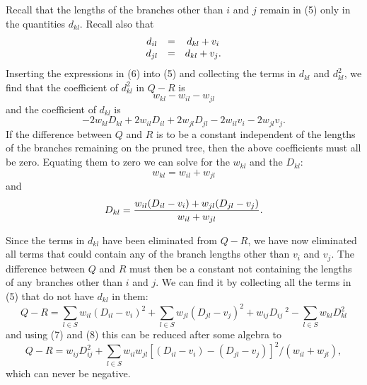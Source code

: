 \documentclass[12pt]{article}
\begin{document}
Recall that the lengths of the branches other than $i$ and $j$ remain in (5) only 
in the quantities $d_{kl}$.  Recall also that 
\begin{equation}
\begin{array}{c c c}
  d_{il}  & =  & d_{kl}  +  v_i\\
  d_{jl}  & =  & d_{kl}  +  v_j.
\end{array}
\end{equation}
\bigskip
Inserting the expressions in (6) into (5) and collecting the terms in
$d_{kl}$ and $d_{kl}^2$, we find that the coefficient of $d_{kl}^2$
in $Q - R$ is
\begin{displaymath}
  w_{kl}  -  w_{il}  -  w_{jl}              
\end{displaymath}
\noindent
and the coefficient of $d_{kl}$ is 
\begin{displaymath}
     - 2 w_{kl} D_{kl}  +  2 w_{il} D_{il}  +  2 w_{jl} D_{jl}  -  2 w_{il} v_i  -  2 w_{jl} v_j.
\end{displaymath}
\bigskip
If the difference between $Q$ and $R$ is to be a constant independent of the
lengths of the branches remaining on the pruned tree, then the above 
coefficients must all
be zero.  Equating them to zero we can solve for the $w_{kl}$ and the $D_{kl}$:
\begin{equation}
  w_{kl}   =   w_{il}  +  w_{jl}
\end{equation}
and
\begin{equation} %
           D_{kl}   = { w_{il} (D_{il} - v_i)  +  w_{jl} (D_{jl} - v_j) \over w_{il}     +     w_{jl}}.
\end{equation}

Since the terms in $d_{kl}$ have been eliminated from $Q - R$, we have now
eliminated all terms that could contain any of the 
branch lengths other than $v_i$ and
$v_j$.  The difference between $Q$ and $R$ must then be a constant not
containing the lengths of any branches other than $i$ and $j$.  We can 
find it by collecting all the terms in (5) that do not have $d_{kl}$
in them:
\begin{equation} %
         Q  -  R   =   \sum_{l\in S}  w_{il} (D_{il} - v_i)^2  +  \sum _{l\in S} w_{jl} (D_{jl} - v_j)^2  + w_{ij} D_{ij}\ ^2 - \sum_{l\in S} w_{kl} D_{kl}^2   
\end{equation}
\noindent
and using (7) and (8) this can be reduced after some algebra to
\begin{equation} %
   Q - R  =  w_{ij} D_{ij}^2 +  \sum_{l\in S}  w_{il} w_{jl} \left[ (D_{il} - v_i) - (D_{jl} - v_j)\right]^2 \Big/ (w_{il} + w_{jl}),
\end{equation}
\noindent
which can never be negative.
\end{document}
